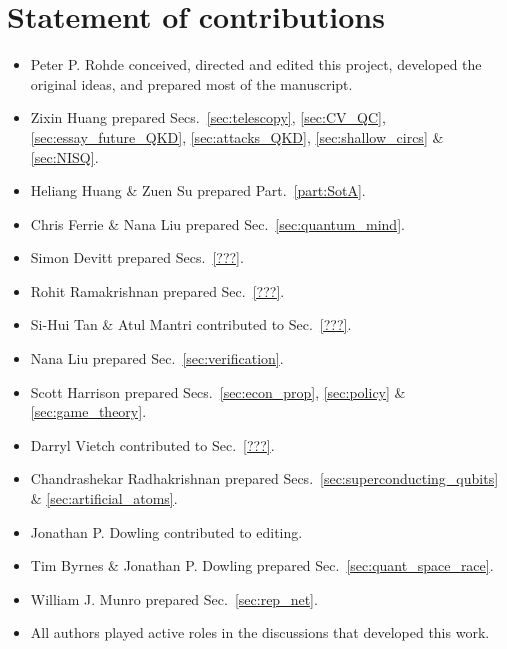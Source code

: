 %
%

\section*{Statement of contributions}

\begin{itemize}
	\item Peter P. Rohde conceived, directed and edited this project, developed the original ideas, and prepared most of the manuscript.
	\item Zixin Huang prepared Secs.~\ref{sec:telescopy}, \ref{sec:CV_QC}, \ref{sec:essay_future_QKD}, \ref{sec:attacks_QKD}, \ref{sec:shallow_circs} \& \ref{sec:NISQ}.
	\item Heliang Huang \& Zuen Su prepared Part.~\ref{part:SotA}.
	\item Chris Ferrie \& Nana Liu prepared Sec.~\ref{sec:quantum_mind}.
	\item Simon Devitt prepared Secs.~\ref{???}.
	\item Rohit Ramakrishnan prepared Sec.~\ref{???}.
	\item Si-Hui Tan \& Atul Mantri contributed to Sec.~\ref{???}.
	\item Nana Liu prepared Sec.~\ref{sec:verification}.
	\item Scott Harrison prepared Secs.~\ref{sec:econ_prop}, \ref{sec:policy} \& \ref{sec:game_theory}.
	\item Darryl Vietch contributed to Sec.~\ref{???}.
	\item Chandrashekar Radhakrishnan prepared Secs.~\ref{sec:superconducting_qubits} \& \ref{sec:artificial_atoms}.
	\item Jonathan P. Dowling contributed to editing.
	\item Tim Byrnes \& Jonathan P. Dowling prepared Sec.~\ref{sec:quant_space_race}.
	\item William J. Munro prepared Sec.~\ref{sec:rep_net}. 
	\item All authors played active roles in the discussions that developed this work. 
\end{itemize}
